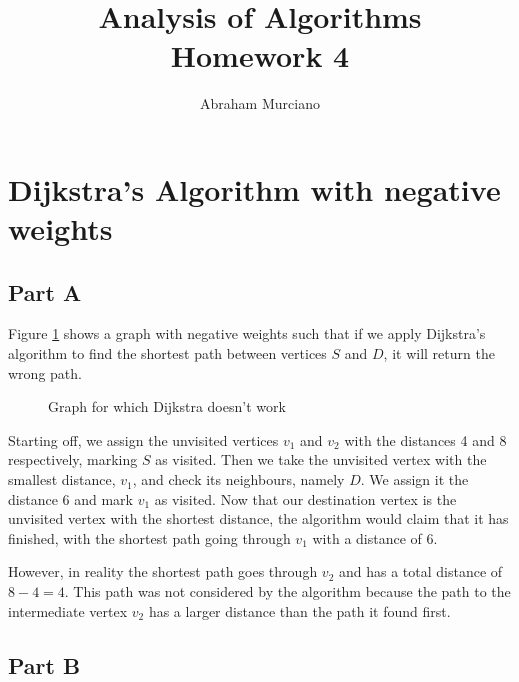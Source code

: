 \documentclass{article}
\title{Analysis of Algorithms \\
\medskip
\large Homework 4}
\author{Abraham Murciano}
\begin{document}
\maketitle

\section{Dijkstra's Algorithm with negative weights}

\subsection*{Part A}

Figure \ref{q1a} shows a graph with negative weights such that if we apply Dijkstra's algorithm to find the shortest path between vertices \(S\) and \(D\), it will return the wrong path.

\begin{figure}[h]
	\centering
	\caption{Graph for which Dijkstra doesn't work}
	\label{q1a}
\end{figure}

Starting off, we assign the unvisited vertices \(v_1\) and \(v_2\) with the distances 4 and 8 respectively, marking \(S\) as visited. Then we take the unvisited vertex with the smallest distance, \(v_1\), and check its neighbours, namely \(D\). We assign it the distance 6 and mark \(v_1\) as visited. Now that our destination vertex is the unvisited vertex with the shortest distance, the algorithm would claim that it has finished, with the shortest path going through \(v_1\) with a distance of 6.

However, in reality the shortest path goes through \(v_2\) and has a total distance of \(8 - 4 = 4\). This path was not considered by the algorithm because the path to the intermediate vertex \(v_2\) has a larger distance than the path it found first.

\subsection*{Part B}
\end{document}

